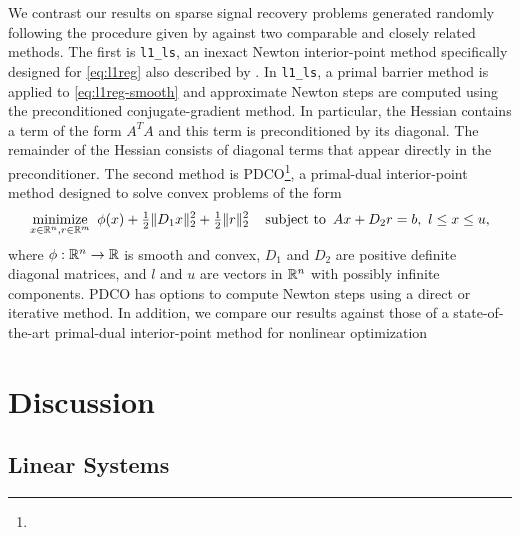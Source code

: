 \documentclass{amsart}
\begin{document}
We contrast our results on sparse signal recovery problems generated randomly
following the procedure given by \cite{kim-koh-lustig-boyd-gorinevsky-2007}
against two comparable and closely related methods. The first is
\texttt{l1\_ls}, an inexact Newton interior-point method specifically designed
for \eqref{eq:l1reg} also described by
\cite{kim-koh-lustig-boyd-gorinevsky-2007}. In \texttt{l1\_ls}, a primal
barrier method is applied to \eqref{eq:l1reg-smooth} and approximate Newton
steps are computed using the preconditioned conjugate-gradient method. In
particular, the Hessian contains a term of the form $A^T A$ and this term is
preconditioned by its diagonal. The remainder of the Hessian consists of
diagonal terms that appear directly in the preconditioner. The second method
is PDCO\footnote{}, a
primal-dual interior-point method designed to solve convex problems of the
form
\begin{equation}
  \label{eq:prob-pdco}
  \displaystyle\mathop{\textup{minimize}}_{x \in \mathbb{R}^n, r \in \mathbb{R}^m} \
  \phi(x) + \tfrac{1}{2} \|D_1 x\|^2_2 + \tfrac{1}{2} \|r\|_2^2
  \quad
  \mathop{\textup{subject to}} \ Ax + D_2 r = b, \ l \leq x \leq u,
\end{equation}
where $\phi: \mathbb{R}^n \to \mathbb{R}$ is smooth and convex, $D_1$ and $D_2$ are positive
definite diagonal matrices, and $l$ and $u$ are vectors in $\mathbb{R}^n$ with
possibly infinite components. PDCO has options to compute Newton steps using a
direct or iterative method. In addition, we compare our results against those of a state-of-the-art primal-dual interior-point method for nonlinear optimization

\section{Discussion}
\label{sec:discussion}

\subsection{Linear Systems}
\end{document}

